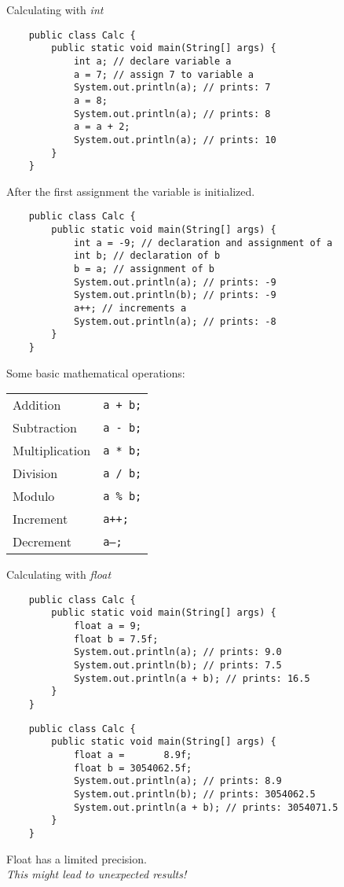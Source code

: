 \begin{frame}{Calculating with \emph{int}}
    \begin{lstlisting}
    public class Calc {
        public static void main(String[] args) {
            int a; // declare variable a
            a = 7; // assign 7 to variable a
            System.out.println(a); // prints: 7
            a = 8;
            System.out.println(a); // prints: 8
            a = a + 2;
            System.out.println(a); // prints: 10
        }
    }
    \end{lstlisting}
    After the first assignment the variable is initialized.
\framebreak
    \begin{lstlisting}
    public class Calc {
        public static void main(String[] args) {
            int a = -9; // declaration and assignment of a
            int b; // declaration of b
            b = a; // assignment of b
            System.out.println(a); // prints: -9
            System.out.println(b); // prints: -9
            a++; // increments a
            System.out.println(a); // prints: -8
        }
    }
    \end{lstlisting}

\framebreak
    Some basic mathematical operations:
    \begin{tabular}{ll}
        Addition & \texttt{a + b;} \\
        Subtraction & \texttt{a - b;} \\
        Multiplication &\texttt{a * b;} \\
        Division & \texttt{a / b;} \\
        Modulo & \texttt{a \% b;} \\
        Increment & \texttt{a++;} \\
        Decrement & \texttt{a--;} \\
    \end{tabular}
\end{frame}

\begin{frame}{Calculating with \emph{float}}
    \begin{lstlisting}
    public class Calc {
        public static void main(String[] args) {
            float a = 9;
            float b = 7.5f;
            System.out.println(a); // prints: 9.0
            System.out.println(b); // prints: 7.5
            System.out.println(a + b); // prints: 16.5
        }
    }
    \end{lstlisting}
\framebreak
    \begin{lstlisting}
    public class Calc {
        public static void main(String[] args) {
            float a =       8.9f;
            float b = 3054062.5f;
            System.out.println(a); // prints: 8.9
            System.out.println(b); // prints: 3054062.5
            System.out.println(a + b); // prints: 3054071.5
        }
    }
    \end{lstlisting}
    Float has a limited precision. \\
    \emph{This might lead to unexpected results!}
\end{frame}

